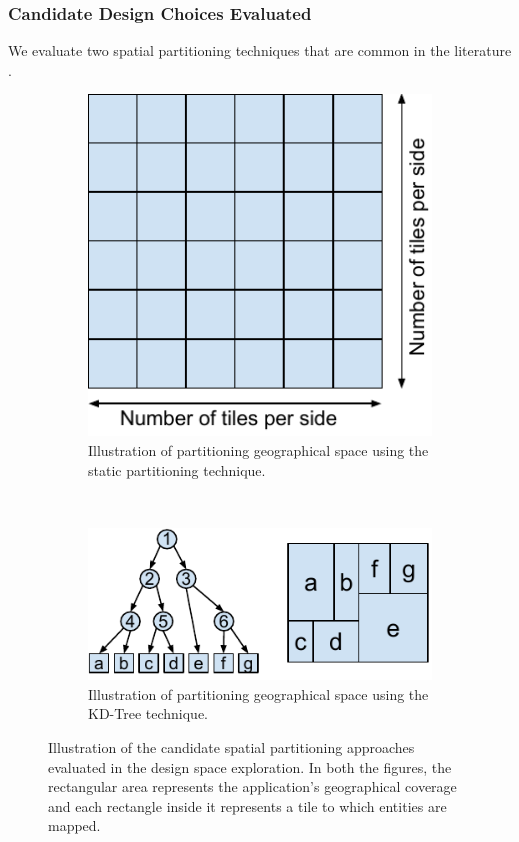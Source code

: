 \subsubsection{Candidate Design Choices Evaluated}
We evaluate two spatial partitioning techniques that are common in the literature \cite{mmog_kdtree, talkycars}.

\begin{figure}
\centering
\begin{subfigure}{0.33\textwidth}
  \centering
  \includegraphics[width=\linewidth]{figures/design_space/spatial/static_partitioning.pdf}
  \caption{Illustration of partitioning geographical space using the static partitioning technique.}
  \label{fig:static_part}
\end{subfigure}%
~~~~~~~~
\begin{subfigure}{0.66\textwidth}
  \centering
  \includegraphics[width=\linewidth]{figures/design_space/spatial/kdtree_partitioning.pdf}
  \caption{Illustration of partitioning geographical space using the KD-Tree technique.}
  \label{fig:kdtree_part}
\end{subfigure}\par\medskip
\caption{Illustration of the candidate spatial partitioning approaches evaluated in the design space exploration. In both the figures, the rectangular area represents the application's geographical coverage and each rectangle inside it represents a tile to which entities are mapped.}
\end{figure}

